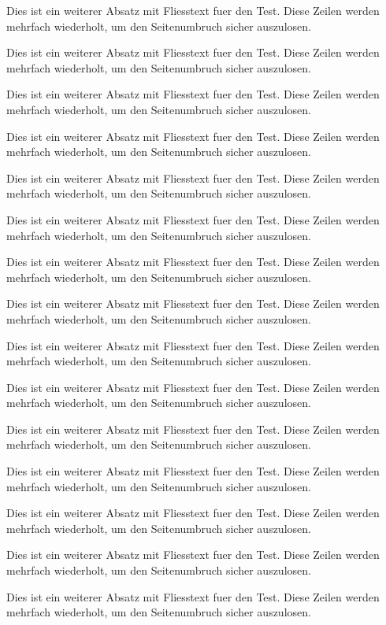 \documentclass[basic]{../../onlinebrief24}
\begin{document}
\begin{letter}{}
\par Dies ist ein weiterer Absatz mit Fliesstext fuer den Test. Diese Zeilen werden mehrfach wiederholt, um den Seitenumbruch sicher auszulosen.
\par Dies ist ein weiterer Absatz mit Fliesstext fuer den Test. Diese Zeilen werden mehrfach wiederholt, um den Seitenumbruch sicher auszulosen.
\par Dies ist ein weiterer Absatz mit Fliesstext fuer den Test. Diese Zeilen werden mehrfach wiederholt, um den Seitenumbruch sicher auszulosen.
\par Dies ist ein weiterer Absatz mit Fliesstext fuer den Test. Diese Zeilen werden mehrfach wiederholt, um den Seitenumbruch sicher auszulosen.
\par Dies ist ein weiterer Absatz mit Fliesstext fuer den Test. Diese Zeilen werden mehrfach wiederholt, um den Seitenumbruch sicher auszulosen.
\par Dies ist ein weiterer Absatz mit Fliesstext fuer den Test. Diese Zeilen werden mehrfach wiederholt, um den Seitenumbruch sicher auszulosen.
\par Dies ist ein weiterer Absatz mit Fliesstext fuer den Test. Diese Zeilen werden mehrfach wiederholt, um den Seitenumbruch sicher auszulosen.
\par Dies ist ein weiterer Absatz mit Fliesstext fuer den Test. Diese Zeilen werden mehrfach wiederholt, um den Seitenumbruch sicher auszulosen.
\par Dies ist ein weiterer Absatz mit Fliesstext fuer den Test. Diese Zeilen werden mehrfach wiederholt, um den Seitenumbruch sicher auszulosen.
\par Dies ist ein weiterer Absatz mit Fliesstext fuer den Test. Diese Zeilen werden mehrfach wiederholt, um den Seitenumbruch sicher auszulosen.
\par Dies ist ein weiterer Absatz mit Fliesstext fuer den Test. Diese Zeilen werden mehrfach wiederholt, um den Seitenumbruch sicher auszulosen.
\par Dies ist ein weiterer Absatz mit Fliesstext fuer den Test. Diese Zeilen werden mehrfach wiederholt, um den Seitenumbruch sicher auszulosen.
\par Dies ist ein weiterer Absatz mit Fliesstext fuer den Test. Diese Zeilen werden mehrfach wiederholt, um den Seitenumbruch sicher auszulosen.
\par Dies ist ein weiterer Absatz mit Fliesstext fuer den Test. Diese Zeilen werden mehrfach wiederholt, um den Seitenumbruch sicher auszulosen.
\par Dies ist ein weiterer Absatz mit Fliesstext fuer den Test. Diese Zeilen werden mehrfach wiederholt, um den Seitenumbruch sicher auszulosen.

\end{letter}
\end{document}
